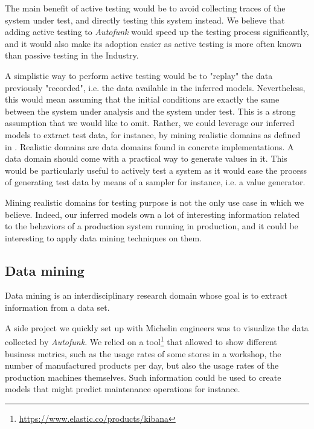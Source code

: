 The main benefit of active testing would be to avoid collecting
traces of the system under test, and directly testing this system
instead. We believe that adding active testing to
\textit{Autofunk} would speed up the testing process
significantly, and it would also make its adoption easier as
active testing is more often known than passive testing in the
Industry.

A simplistic way to perform active testing would be to "replay"
the data previously "recorded", i.e. the data available in the
inferred models. Nevertheless, this would mean assuming that the
initial conditions are exactly the same between the system under
analysis and the system under test. This is a strong assumption
that we would like to omit. Rather, we could leverage our
inferred models to extract test data, for instance, by mining
realistic domains as defined in
\cite{Enderlin:2011:PSL:2075545.2075551}. Realistic domains are
data domains found in concrete implementations. A data domain
should come with a practical way to generate values in it. This
would be particularly useful to actively test a system as it
would ease the process of generating test data by means of a
sampler for instance, i.e. a value generator.

Mining realistic domains for testing purpose is not the only use
case in which we believe. Indeed, our inferred models own a lot
of interesting information related to the behaviors of a
production system running in production, and it could be
interesting to apply data mining techniques on them.

\subsection{Data mining}
\label{sec:conclusion:testing:data}

Data mining \cite{chakrabarti2006data} is an interdisciplinary
research domain whose goal is to extract information from a data
set.

A side project we quickly set up with Michelin engineers was to
visualize the data collected by \textit{Autofunk}. We relied on a
tool\footnote{\url{https://www.elastic.co/products/kibana}} that
allowed to show different business metrics, such as the usage
rates of some stores in a workshop, the number of manufactured
products per day, but also the usage rates of the production
machines themselves. Such information could be used to create
models that might predict maintenance operations for instance.

